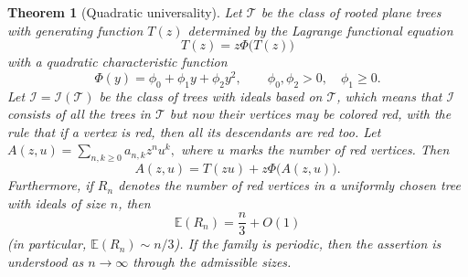 \documentclass[11pt, onesided]{amsart}
\newtheorem{theorem}{Theorem}[section]
\theoremstyle{remark}
\begin{document}
\begin{theorem}[Quadratic universality]\label{thm:quadratic-universality}
Let $\mathcal T$ be the class of rooted plane trees with
generating function \(T(z)\) determined by the Lagrange functional equation
\begin{equation} \label{charac}
T(z)=z\Phi\big(T(z)\big)
\end{equation}
with a quadratic characteristic function
\[
\Phi(y)=\phi_0+\phi_1y+\phi_2y^2,
\qquad
\phi_0,\phi_2>0,\quad \phi_1\geq 0.
\]
Let $\mathcal I = \mathcal I(\mathcal T)$ be the class of trees with ideals based on $\mathcal T$, which means that $\mathcal I$ consists of all the trees in $\mathcal T$
but now their vertices may be colored red, with the rule that if a vertex is red, then all its descendants are red too. Let
$
A(z,u)=\sum_{n,k\geq 0} a_{n,k}z^n u^k,
$
where \(u\) marks the number of red vertices. Then
\begin{equation} \label{defining}
A(z,u)=T(zu)+z\Phi\big(A(z,u)\big).
\end{equation}
Furthermore, if \(R_n\) denotes the number of red vertices in a uniformly chosen
tree with ideals of size \(n\), then
\[
\mathbb{E}(R_n)=\frac{n}{3}+O(1)
\]
(in particular, $\mathbb{E}(R_n)\sim n/3$).
If the family is periodic, then the assertion is understood as
\(n\to\infty\) through the admissible sizes.
\end{theorem}
\end{document}
